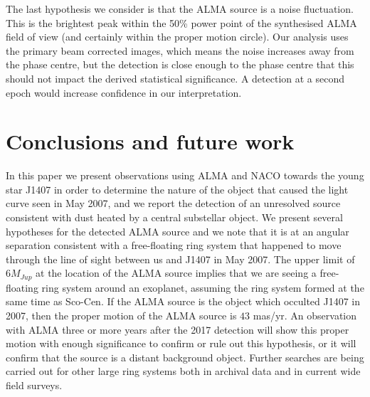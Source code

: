 \documentclass{aa} %
\begin{document}
The last hypothesis we consider is that the ALMA source is a noise fluctuation.
%
This is the brightest peak within the 50\% power point of the synthesised ALMA field of view (and certainly within the proper motion circle).
%
Our analysis uses the primary beam corrected images, which means the noise increases away from the phase centre, but the detection is close enough to the phase centre that this should not impact the derived statistical significance.
%
A detection at a second epoch would increase confidence in our interpretation.

\section{Conclusions and future work}\label{concl} %

In this paper we present observations using ALMA and NACO towards the young star J1407 in order to determine the nature of the object that caused the light curve seen in May 2007, and we report the detection of an unresolved source consistent with dust heated by a central substellar object.
%
We present several hypotheses for the detected ALMA source and we note that it is at an angular separation consistent with a free-floating ring system that happened to move through the line of sight between us and J1407 in May 2007.
%
The upper limit of $6M_{Jup}$ at the location of the ALMA source implies that we are seeing a free-floating ring system around an exoplanet, assuming the ring system formed at the same time as Sco-Cen.
%
If the ALMA source is the object which occulted J1407 in 2007, then the proper motion of the ALMA source is $43$ mas/yr. 
%
An observation with ALMA three or more years after the 2017 detection will show this proper motion with enough significance to confirm or rule out this hypothesis, or it will confirm that the source is a distant background object.
%
Further searches are being carried out for other large ring systems both in archival data and in current wide field surveys.
\end{document}
